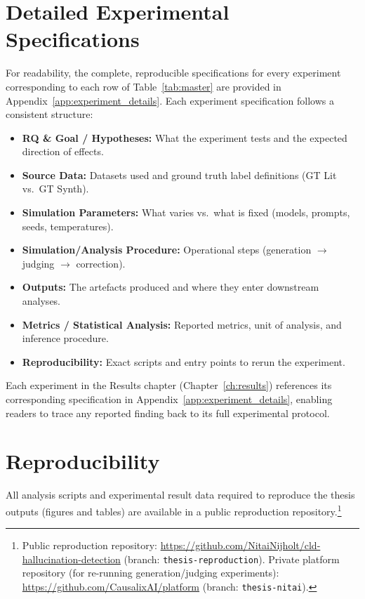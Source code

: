 \section{Detailed Experimental Specifications}
\label{sec:experimental_details_ref}

For readability, the complete, reproducible specifications for every experiment corresponding to each row of Table~\ref{tab:master} are provided in Appendix~\ref{app:experiment_details}. Each experiment specification follows a consistent structure:
\begin{itemize}[noitemsep]
    \item \textbf{RQ \& Goal / Hypotheses:} What the experiment tests and the expected direction of effects.
    \item \textbf{Source Data:} Datasets used and ground truth label definitions (GT Lit vs.\ GT Synth).
    \item \textbf{Simulation Parameters:} What varies vs.\ what is fixed (models, prompts, seeds, temperatures).
    \item \textbf{Simulation/Analysis Procedure:} Operational steps (generation $\rightarrow$ judging $\rightarrow$ correction).
    \item \textbf{Outputs:} The artefacts produced and where they enter downstream analyses.
    \item \textbf{Metrics / Statistical Analysis:} Reported metrics, unit of analysis, and inference procedure.
    \item \textbf{Reproducibility:} Exact scripts and entry points to rerun the experiment.
\end{itemize}
Each experiment in the Results chapter (Chapter~\ref{ch:results}) references its corresponding specification in Appendix~\ref{app:experiment_details}, enabling readers to trace any reported finding back to its full experimental protocol.

\section{Reproducibility}
\label{sec:reproduction}

All analysis scripts and experimental result data required to reproduce the thesis outputs (figures and tables) are available in a public reproduction repository.\footnote{Public reproduction repository: \url{https://github.com/NitaiNijholt/cld-hallucination-detection} (branch: \texttt{thesis-reproduction}). Private platform repository (for re-running generation/judging experiments): \url{https://github.com/CausalixAI/platform} (branch: \texttt{thesis-nitai}).}

